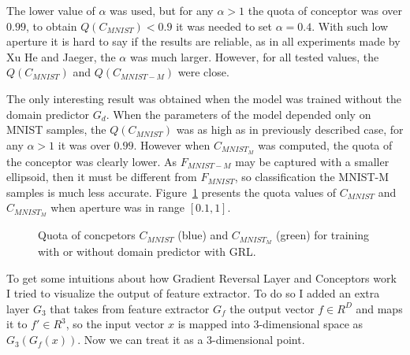 \documentclass{article}
\begin{document}
\par
The lower value of $\alpha$ was used, but for any $\alpha > 1$ the quota of conceptor was over $0.99$, to obtain $Q(C_{MNIST}) < 0.9$ it was needed to set $\alpha = 0.4$. With such low aperture it is hard to say if the results are reliable, as in all experiments made by Xu He and Jaeger, the $\alpha$ was much larger. However, for all tested values, the $Q(C_{MNIST})$ and $Q(C_{MNIST-M})$ were close.
\par
The only interesting result was obtained when the model was trained without the domain predictor $G_{d}$. When the parameters of the model depended only on MNIST samples, the $Q(C_{MNIST})$ was as high as in previously described case, for any $\alpha > 1$ it was over $0.99$. However when $C_{MNIST_M}$ was computed, the quota of the conceptor was clearly lower. As $F_{MNIST-M}$ may be captured with a smaller ellipsoid, then it must be different from $F_{MNIST}$, so classification the MNIST-M samples is much less accurate. Figure~\ref{fig:Q(C)} presents the quota values of $C_{MNIST}$ and $C_{MNIST_M}$ when aperture was in range $[0.1, 1]$.

\begin{figure}
    \centering
    \qquad
    \caption{Quota of concpetors $C_{MNIST}$ (blue) and $C_{MNIST_M}$ (green) for training with or without domain predictor with GRL.}%
    \label{fig:Q(C)}%
\end{figure}

\par
To get some intuitions about how Gradient Reversal Layer and Conceptors work I tried to visualize the output of feature extractor. To do so I added an extra layer $G_{3}$ that takes from feature extractor $G_{f}$ the output vector ${ f } \in { R } ^ { D }$ and maps it to ${f'} \in {R}^{3}$, so the input vector ${x}$ is mapped into 3-dimensional space as $G_{3}(G_{f}(x))$. Now we can treat it as a 3-dimensional point. 
\end{document}
